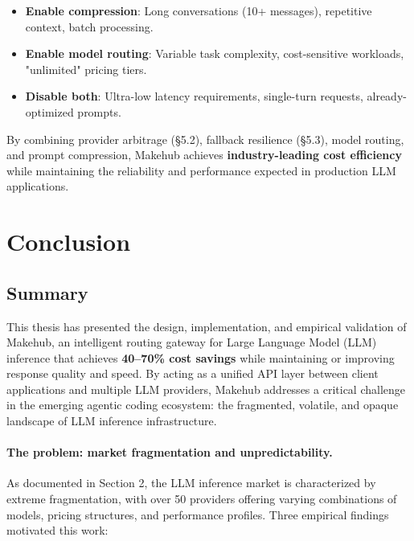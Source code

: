 \documentclass[english]{article}
\begin{document}
\begin{itemize}
    \item \textbf{Enable compression}: Long conversations (10+ messages), repetitive context, batch processing.
    \item \textbf{Enable model routing}: Variable task complexity, cost-sensitive workloads, "unlimited" pricing tiers.
    \item \textbf{Disable both}: Ultra-low latency requirements, single-turn requests, already-optimized prompts.
\end{itemize}

By combining provider arbitrage (§5.2), fallback resilience (§5.3), model routing, and prompt compression, Makehub achieves \textbf{industry-leading cost efficiency} while maintaining the reliability and performance expected in production LLM applications.


\newpage
\section{Conclusion}

\subsection{Summary}

This thesis has presented the design, implementation, and empirical validation of Makehub, an intelligent routing gateway for Large Language Model (LLM) inference that achieves \textbf{40--70\% cost savings} while maintaining or improving response quality and speed. By acting as a unified API layer between client applications and multiple LLM providers, Makehub addresses a critical challenge in the emerging agentic coding ecosystem: the fragmented, volatile, and opaque landscape of LLM inference infrastructure.

\paragraph{The problem: market fragmentation and unpredictability.}

As documented in Section 2, the LLM inference market is characterized by extreme fragmentation, with over 50 providers offering varying combinations of models, pricing structures, and performance profiles. Three empirical findings motivated this work:
\end{document}
